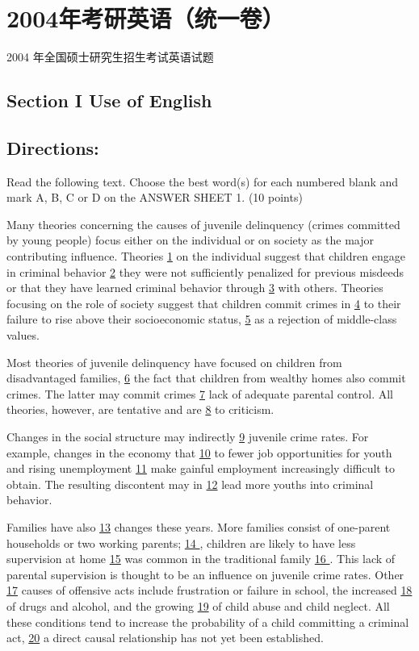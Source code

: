\documentclass[UTF8,11pt]{ctexart}
\begin{document}
\section*{2004年考研英语（统一卷）}
2004 年全国硕士研究生招生考试英语试题


\subsection*{\textbf{Section I Use of English}}


\subsection*{\textbf{Directions:}}


Read the following text. Choose the best word(s) for each numbered blank and mark A, B, C or D on the ANSWER SHEET 1. (10 points)


Many theories concerning the causes of juvenile delinquency (crimes committed by young people) focus either on the individual or on society as the major contributing influence. Theories \uline{1} on the individual suggest that children engage in criminal behavior \uline{2} they were not sufficiently penalized for previous misdeeds or that they have learned criminal behavior through \uline{3} with others. Theories focusing on the role of society suggest that children commit crimes in \uline{4} to their failure to rise above their socioeconomic status, \uline{5} as a rejection of middle-class values.


Most theories of juvenile delinquency have focused on children from disadvantaged families, \uline{6} the fact that children from wealthy homes also commit crimes. The latter may commit crimes \uline{7} lack of adequate parental control. All theories, however, are tentative and are \uline{8} to criticism.


Changes in the social structure may indirectly \uline{9} juvenile crime rates. For example, changes in the economy that \uline{10} to fewer job opportunities for youth and rising unemployment \uline{11} make gainful employment increasingly difficult to obtain. The resulting discontent may in \uline{12} lead more youths into criminal behavior.


Families have also \uline{13} changes these years. More families consist of one-parent households or two working parents; \uline{14 }, children are likely to have less supervision at home \uline{15} was common in the traditional family \uline{16 }. This lack of parental supervision is thought to be an influence on juvenile crime rates. Other \uline{17} causes of offensive acts include frustration or failure in school, the increased \uline{18} of drugs and alcohol, and the growing \uline{19} of child abuse and child neglect. All these conditions tend to increase the probability of a child committing a criminal act, \uline{20} a direct causal relationship has not yet been established.
\end{document}
